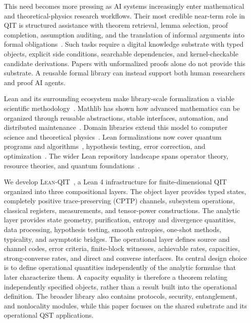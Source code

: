 \documentclass[10pt,a4paper]{article}
\DeclareRobustCommand{\LeanQIT}{\textnormal{\textsc{Lean-QIT}}}
\begin{document}
This need becomes more pressing as AI systems increasingly enter mathematical and theoretical-physics research workflows. Their most credible near-term role in QIT is structured assistance with theorem retrieval, lemma selection, proof completion, assumption auditing, and the translation of informal arguments into formal obligations~\cite{Yang2024FormalMathReasoning,Xin2026AXLE}. Such tasks require a digital knowledge substrate with typed objects, explicit side conditions, searchable dependencies, and kernel-checkable candidate derivations. Papers with unformalized proofs alone do not provide this substrate. A reusable formal library can instead support both human researchers and proof AI agents.

Lean and its surrounding ecosystem make library-scale formalization a viable scientific methodology~\cite{deMoura2015,deMoura2021}. Mathlib has shown how advanced mathematics can be organized through reusable abstractions, stable interfaces, automation, and distributed maintenance~\cite{mathlib2020}. Domain libraries extend this model to computer science and theoretical physics~\cite{Barrett2026CSLib,PhyslibRepository,ToobySmith2024}. Lean formalizations now cover quantum programs and algorithms~\cite{Bordg2020,Peng2023}, hypothesis testing, error correction, and optimization~\cite{Meiburg2025,Ehatamm2026LeanQEC,Kol2026QuantumOptimization}. The wider Lean repository landscape spans operator theory, resource theories, and quantum foundations~\cite{Meiburg2026QuantumLeanRepos}.

We develop \LeanQIT{}~\cite{leanqit}, a Lean 4 infrastructure for finite-dimensional QIT organized into three compositional layers. The object layer provides typed states, completely positive trace-preserving (CPTP) channels, subsystem operations, classical registers, measurements, and tensor-power constructions. The analytic layer provides state geometry, purification, entropy and divergence quantities, data processing, hypothesis testing, smooth entropies, one-shot methods, typicality, and asymptotic bridges. The operational layer defines source and channel codes, error criteria, finite-block witnesses, achievable rates, capacities, strong-converse rates, and direct and converse interfaces. Its central design choice is to define operational quantities independently of the analytic formulae that later characterize them. A capacity equality is therefore a theorem relating independently specified objects, rather than a result built into the operational definition. The broader library also contains protocols, security, entanglement, and nonlocality modules, while this paper focuses on the shared substrate and its operational QST applications.
\end{document}
